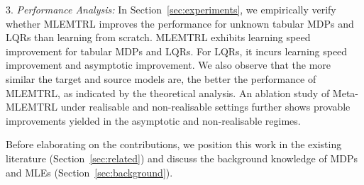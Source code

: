3. \textit{Performance Analysis:} In Section~\ref{sec:experiments}, we empirically verify whether MLEMTRL improves the performance for unknown tabular MDPs and LQRs than learning from scratch. MLEMTRL exhibits learning speed improvement for tabular MDPs and LQRs. For LQRs, it incurs learning speed improvement and asymptotic improvement. We also observe that the more similar the target and source models are, the better the performance of MLEMTRL, as indicated by the theoretical analysis. An ablation study of Meta-MLEMTRL under realisable and non-realisable settings further shows provable improvements yielded in the asymptotic and non-realisable regimes.%



Before elaborating on the contributions, we position this work in the existing literature (Section~\ref{sec:related}) and discuss the background knowledge of MDPs and MLEs (Section~\ref{sec:background}).

